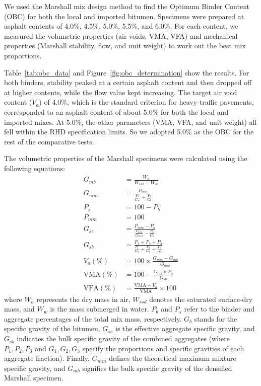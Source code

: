 \documentclass[12pt,a4paper]{article}
\begin{document}
We used the Marshall mix design method to find the Optimum Binder Content (OBC) for both the local and imported bitumen. Specimens were prepared at asphalt contents of 4.0\%, 4.5\%, 5.0\%, 5.5\%, and 6.0\%. For each content, we measured the volumetric properties (air voids, VMA, VFA) and mechanical properties (Marshall stability, flow, and unit weight) to work out the best mix proportions.

Table~\ref{tab:obc_data} and Figure~\ref{fig:obc_determination} show the results. For both binders, stability peaked at a certain asphalt content and then dropped off at higher contents, while the flow value kept increasing. The target air void content ($V_a$) of 4.0\%, which is the standard criterion for heavy-traffic pavements, corresponded to an asphalt content of about 5.0\% for both the local and imported mixes. At 5.0\%, the other parameters (VMA, VFA, and unit weight) all fell within the RHD specification limits. So we adopted 5.0\% as the OBC for the rest of the comparative tests.

The volumetric properties of the Marshall specimens were calculated using the following equations:
\begin{align}
    G_{mb} &= \frac{W_a}{W_{ssd} - W_w} \\
    G_{mm} &= \frac{P_{mm}}{\frac{P_s}{G_{se}} + \frac{P_b}{G_b}} \\
    P_s &= 100 - P_b \\
    P_{mm} &= 100 \\
    G_{se} &= \frac{P_{mm} - P_b}{\frac{P_{mm}}{G_{mm}} - \frac{P_b}{G_b}} \\
    G_{sb} &= \frac{P_1 + P_2 + P_3}{\frac{P_1}{G_1} + \frac{P_2}{G_2} + \frac{P_3}{G_3}} \\
    V_a (\%) &= 100 \times \frac{G_{mm} - G_{mb}}{G_{mm}} \\
    \text{VMA} (\%) &= 100 - \frac{G_{mb} \times P_s}{G_{sb}} \\
    \text{VFA} (\%) &= \frac{\text{VMA} - V_a}{\text{VMA}} \times 100
\end{align}
where $W_a$ represents the dry mass in air, $W_{ssd}$ denotes the saturated surface-dry mass, and $W_w$ is the mass submerged in water. $P_b$ and $P_s$ refer to the binder and aggregate percentages of the total mix mass, respectively. $G_b$ stands for the specific gravity of the bitumen, $G_{se}$ is the effective aggregate specific gravity, and $G_{sb}$ indicates the bulk specific gravity of the combined aggregates (where $P_1, P_2, P_3$ and $G_1, G_2, G_3$ specify the proportions and specific gravities of each aggregate fraction). Finally, $G_{mm}$ defines the theoretical maximum mixture specific gravity, and $G_{mb}$ signifies the bulk specific gravity of the densified Marshall specimen.
\end{document}

